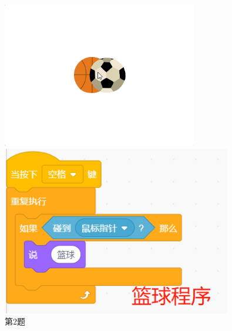 \documentclass[10pt, a4paper]{article}
\begin{document}
\begin{enumerate}
\begin{figure}[htbp]
\begin{minipage}[t]{.15\textwidth}
                \caption*{第2题}
            \end{minipage}
            \begin{minipage}[t]{.6\textwidth}
                \begin{minipage}[t]{.32\textwidth}
                    \centering
                    \includegraphics[width=\textwidth]{4-1.png}
                \end{minipage}
                \begin{minipage}[t]{.32\textwidth}
                    \centering
                    \includegraphics[width=\textwidth]{4-2.png}
                \end{minipage}
                \begin{minipage}[t]{.32\textwidth}

\end{minipage}
\end{minipage}
\end{figure}
\end{enumerate}
\end{document}
